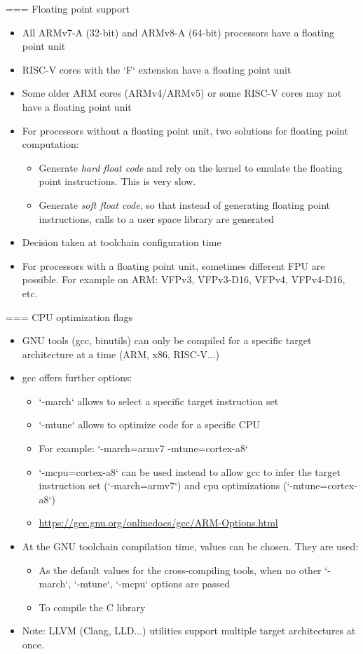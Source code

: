 === {Floating point support}
  \begin{itemize}
  \item All ARMv7-A (32-bit) and ARMv8-A (64-bit) processors have a
    floating point unit
  \item RISC-V cores with the `F` extension have a floating point
    unit
  \item Some older ARM cores (ARMv4/ARMv5) or some RISC-V cores may
    not have a floating point unit
  \item For processors without a floating point unit, two solutions
    for floating point computation:
    \begin{itemize}
    \item Generate {\em hard float code} and rely on the kernel to
      emulate the floating point instructions. This is very slow.
    \item Generate {\em soft float code}, so that instead of
      generating floating point instructions, calls to a user space
      library are generated
    \end{itemize}
  \item Decision taken at toolchain configuration time
  \item For processors with a floating point unit, sometimes different
    FPU are possible. For example on ARM: VFPv3, VFPv3-D16, VFPv4,
    VFPv4-D16, etc.
  \end{itemize}


=== CPU optimization flags
  \begin{itemize}
  \item GNU tools (gcc, binutils) can only be compiled for a specific
        target architecture at a time (ARM, x86, RISC-V...)
  \item gcc offers further options:
    \begin{itemize}
    \item `-march` allows to select a specific target instruction set
    \item `-mtune` allows to optimize code for a specific CPU
    \item For example: `-march=armv7 -mtune=cortex-a8`
    \item `-mcpu=cortex-a8` can be used instead to allow gcc to infer the target
      instruction set (`-march=armv7`) and cpu optimizations (`-mtune=cortex-a8`)
    \item \url{https://gcc.gnu.org/onlinedocs/gcc/ARM-Options.html}
    \end{itemize}
  \item At the GNU toolchain compilation time, values can be chosen. They are used:
    \begin{itemize}
    \item As the default values for the cross-compiling tools, when no
      other `-march`, `-mtune`, `-mcpu` options are
      passed
    \item To compile the C library
    \end{itemize}
  \item Note: LLVM (Clang, LLD...) utilities support multiple target architectures at once.
  \end{itemize}

